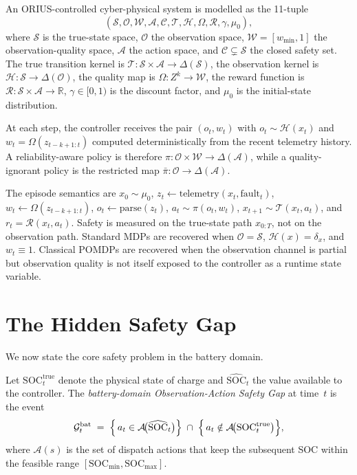 \begin{definition}
\label{def:orius-mdp}
An ORIUS-controlled cyber-physical system is modelled as the 11-tuple
\[
  (\mathcal{S}, \mathcal{O}, \mathcal{W}, \mathcal{A}, \mathcal{C},
   \mathcal{T}, \mathcal{H}, \Omega, \mathcal{R}, \gamma, \mu_0),
\]
where $\mathcal{S}$ is the true-state space, $\mathcal{O}$ the observation
space, $\mathcal{W} = [w_{\min}, 1]$ the observation-quality space,
$\mathcal{A}$ the action space, and $\mathcal{C}\subsetneq\mathcal{S}$ the
closed safety set.  The true transition kernel is
$\mathcal{T}: \mathcal{S}\times\mathcal{A}\to\Delta(\mathcal{S})$, the
observation kernel is $\mathcal{H}: \mathcal{S}\to\Delta(\mathcal{O})$, the
quality map is $\Omega: Z^k\to\mathcal{W}$, the reward function is
$\mathcal{R}: \mathcal{S}\times\mathcal{A}\to\mathbb{R}$, $\gamma\in[0,1)$ is
the discount factor, and $\mu_0$ is the initial-state distribution.

At each step, the controller receives the pair $(o_t,w_t)$ with
$o_t\sim\mathcal{H}(x_t)$ and
$w_t = \Omega(z_{t-k+1:t})$ computed deterministically from the recent
telemetry history.  A reliability-aware policy is therefore
$\pi:\mathcal{O}\times\mathcal{W}\to\Delta(\mathcal{A})$, while a
quality-ignorant policy is the restricted map
$\bar{\pi}:\mathcal{O}\to\Delta(\mathcal{A})$.
\end{definition}

\begin{remark}
The episode semantics are
$x_0\sim\mu_0$,
$z_t\leftarrow \mathrm{telemetry}(x_t,\mathrm{fault}_t)$,
$w_t\leftarrow\Omega(z_{t-k+1:t})$,
$o_t\leftarrow \mathrm{parse}(z_t)$,
$a_t\sim\pi(o_t,w_t)$,
$x_{t+1}\sim\mathcal{T}(x_t,a_t)$,
and $r_t=\mathcal{R}(x_t,a_t)$.  Safety is measured on the true-state path
$x_{0:T}$, not on the observation path.  Standard MDPs are recovered when
$\mathcal{O}=\mathcal{S}$, $\mathcal{H}(x)=\delta_x$, and $w_t\equiv 1$.
Classical POMDPs are recovered when the observation channel is partial but
observation quality is not itself exposed to the controller as a runtime
state variable.
\end{remark}

\section{The Hidden Safety Gap}
\label{sec:hidden-gap}

We now state the core safety problem in the battery domain.

\begin{definition}
\label{def:battery-oasg}
Let $\mathrm{SOC}_t^{\mathrm{true}}$ denote the physical state of charge
and $\widehat{\mathrm{SOC}}_t$ the value available to the controller.
The \emph{battery-domain Observation-Action Safety Gap} at time~$t$ is the
event
\[
  \mathcal{G}_t^{\mathrm{bat}} \;=\;
  \Bigl\{\,a_t \in \mathcal{A}\!\bigl(\widehat{\mathrm{SOC}}_t\bigr)\Bigr\}
  \;\cap\;
  \Bigl\{\,a_t \notin \mathcal{A}\!\bigl(\mathrm{SOC}_t^{\mathrm{true}}\bigr)\Bigr\},
\]
where $\mathcal{A}(s)$ is the set of dispatch actions that keep the
subsequent SOC within the feasible range $[\mathrm{SOC}_{\min},
\mathrm{SOC}_{\max}]$.
\end{definition}

